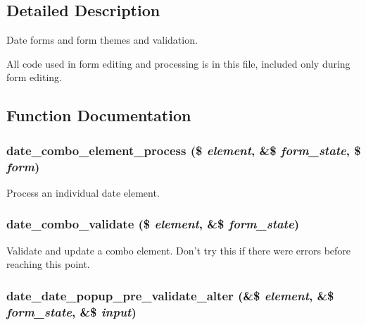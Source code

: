 \subsection{Detailed Description}
Date forms and form themes and validation.

All code used in form editing and processing is in this file, included only during form editing. 

\subsection{Function Documentation}
\hypertarget{date__elements_8inc_a9542273df9fca1ba0a55c26573f3744e}{
\subsubsection[{date\_\-combo\_\-element\_\-process}]{\setlength{\rightskip}{0pt plus 5cm}date\_\-combo\_\-element\_\-process (\$ {\em element}, \/  \&\$ {\em form\_\-state}, \/  \$ {\em form})}}
\label{date__elements_8inc_a9542273df9fca1ba0a55c26573f3744e}
Process an individual date element. \hypertarget{date__elements_8inc_ad3819d1cdfb02b44cf0d4dd424a837ba}{
\subsubsection[{date\_\-combo\_\-validate}]{\setlength{\rightskip}{0pt plus 5cm}date\_\-combo\_\-validate (\$ {\em element}, \/  \&\$ {\em form\_\-state})}}
\label{date__elements_8inc_ad3819d1cdfb02b44cf0d4dd424a837ba}
Validate and update a combo element. Don't try this if there were errors before reaching this point. \hypertarget{date__elements_8inc_a955d565e21db7029f550ce0f35bda5d2}{
\subsubsection[{date\_\-date\_\-popup\_\-pre\_\-validate\_\-alter}]{\setlength{\rightskip}{0pt plus 5cm}date\_\-date\_\-popup\_\-pre\_\-validate\_\-alter (\&\$ {\em element}, \/  \&\$ {\em form\_\-state}, \/  \&\$ {\em input})}}
